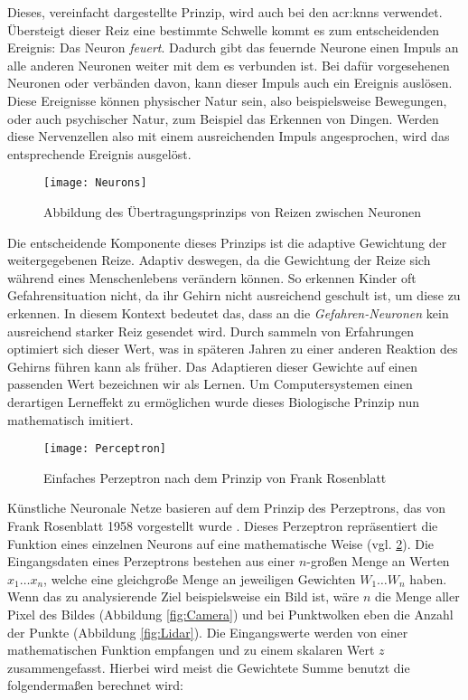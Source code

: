 Dieses, vereinfacht dargestellte Prinzip, wird auch bei den \acrshort{acr:knn}s verwendet. Übersteigt dieser Reiz eine bestimmte Schwelle kommt es zum entscheidenden Ereignis: Das Neuron \textit{feuert}. Dadurch gibt das feuernde Neurone einen Impuls an alle anderen Neuronen weiter mit dem es verbunden ist. Bei dafür vorgesehenen Neuronen oder verbänden davon, kann dieser Impuls auch ein Ereignis auslösen. Diese Ereignisse können physischer Natur sein, also beispielsweise Bewegungen, oder auch psychischer Natur, zum Beispiel das Erkennen von Dingen. Werden diese Nervenzellen also mit einem ausreichenden Impuls angesprochen, wird das entsprechende Ereignis ausgelöst.\\

\begin{figure}%
	\centering
    \texttt{[image: Neurons]}
    \caption{Abbildung des Übertragungsprinzips von Reizen zwischen Neuronen \cite{bib:Neurons}}
    \label{fig:Neurons}
\end{figure}

Die entscheidende Komponente dieses Prinzips ist die adaptive Gewichtung der weitergegebenen Reize. Adaptiv deswegen, da die Gewichtung der Reize sich während eines Menschenlebens verändern können. So erkennen Kinder oft Gefahrensituation nicht, da ihr Gehirn nicht ausreichend geschult ist, um diese zu erkennen. In diesem Kontext bedeutet das, dass an die \textit{Gefahren-Neuronen} kein ausreichend starker Reiz gesendet wird. Durch sammeln von Erfahrungen optimiert sich dieser Wert, was in späteren Jahren zu einer anderen Reaktion des Gehirns führen kann als früher. Das Adaptieren dieser Gewichte auf einen passenden Wert bezeichnen wir als Lernen. Um Computersystemen einen derartigen Lerneffekt zu ermöglichen wurde dieses Biologische Prinzip nun mathematisch imitiert. \\

\begin{figure}%
	\centering
    \texttt{[image: Perceptron]}
    \caption{Einfaches Perzeptron nach dem Prinzip von Frank Rosenblatt}
    \label{fig:Perceptron}
\end{figure}

Künstliche Neuronale Netze basieren auf dem Prinzip des Perzeptrons, das von Frank Rosenblatt 1958 vorgestellt wurde \cite{bib:Perzeptron}. Dieses Perzeptron repräsentiert die Funktion eines einzelnen Neurons auf eine mathematische Weise (vgl. \ref{fig:Perceptron}). Die Eingangsdaten eines Perzeptrons bestehen aus einer \(n\)-großen Menge an Werten \(x_1 \dots x_n\), welche eine gleichgroße Menge an jeweiligen Gewichten \(W_1 \dots W_n\) haben. Wenn das zu analysierende Ziel beispielsweise ein Bild ist, wäre \(n\) die Menge aller Pixel des Bildes (Abbildung \ref{fig:Camera}) und bei Punktwolken eben die Anzahl der Punkte (Abbildung \ref{fig:Lidar}). Die Eingangswerte werden von einer mathematischen Funktion empfangen und zu einem skalaren Wert \(z\) zusammengefasst. Hierbei wird meist die Gewichtete Summe benutzt die folgendermaßen berechnet wird:

